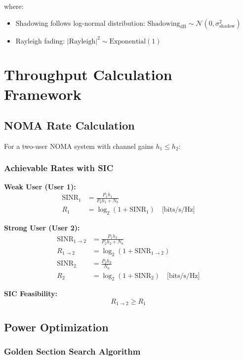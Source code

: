 \documentclass[11pt,a4paper]{article}
\begin{document}
where:
\begin{itemize}
    \item Shadowing follows log-normal distribution: $\text{Shadowing}_{\text{dB}} \sim \mathcal{N}(0, \sigma_{\text{shadow}}^2)$
    \item Rayleigh fading: $|\text{Rayleigh}|^2 \sim \text{Exponential}(1)$
\end{itemize}

\section{Throughput Calculation Framework}

\subsection{NOMA Rate Calculation}

For a two-user NOMA system with channel gains $h_1 \leq h_2$:

\subsubsection{Achievable Rates with SIC}

\textbf{Weak User (User 1):}
\begin{align}
\text{SINR}_1 &= \frac{P_1 h_1}{P_2 h_1 + N_0} \\
R_1 &= \log_2(1 + \text{SINR}_1) \quad \text{[bits/s/Hz]}
\end{align}

\textbf{Strong User (User 2):}
\begin{align}
\text{SINR}_{1 \rightarrow 2} &= \frac{P_1 h_2}{P_2 h_2 + N_0} \\
R_{1 \rightarrow 2} &= \log_2(1 + \text{SINR}_{1 \rightarrow 2}) \\
\text{SINR}_2 &= \frac{P_2 h_2}{N_0} \\
R_2 &= \log_2(1 + \text{SINR}_2) \quad \text{[bits/s/Hz]}
\end{align}

\textbf{SIC Feasibility:}
\begin{equation}
R_{1 \rightarrow 2} \geq R_1
\end{equation}

\subsection{Power Optimization}

\subsubsection{Golden Section Search Algorithm}
\end{document}
